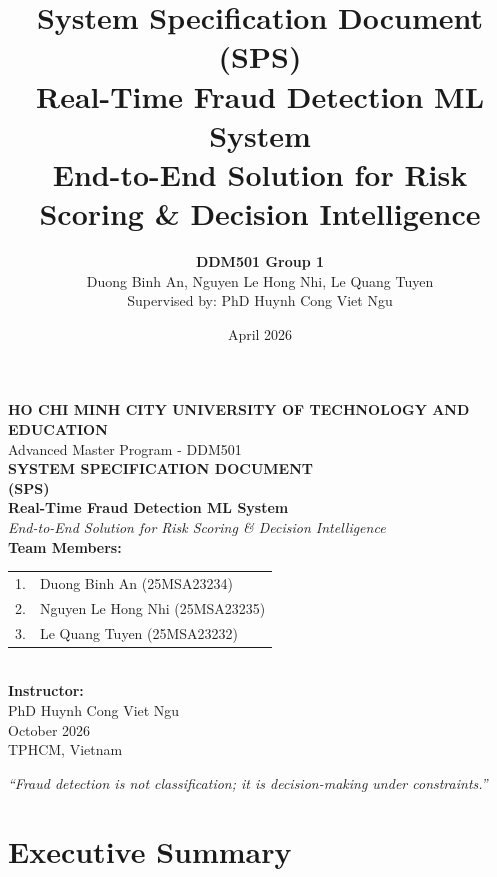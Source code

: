 \documentclass[12pt,a4paper]{article}
\title{\LARGE \textbf{System Specification Document (SPS)} \\[0.3cm]
       \Large Real-Time Fraud Detection ML System \\[0.3cm]
       \large End-to-End Solution for Risk Scoring \& Decision Intelligence}
\author{\textbf{DDM501 Group 1} \\[0.2cm]
        Duong Binh An, Nguyen Le Hong Nhi, Le Quang Tuyen \\
        Supervised by: PhD Huynh Cong Viet Ngu}
\date{April 2026}
\begin{document}
\begin{titlepage}
\centering
\vspace*{3cm}

{\Large \textbf{HO CHI MINH CITY UNIVERSITY OF TECHNOLOGY AND EDUCATION}}\\[0.5cm]
{\normalsize Advanced Master Program - DDM501}\\[2.5cm]

{\LARGE \textbf{SYSTEM SPECIFICATION DOCUMENT}}\\[0.3cm]
{\LARGE \textbf{(SPS)}}\\[2cm]

{\Large \textbf{Real-Time Fraud Detection ML System}}\\[0.2cm]
{\large \textit{End-to-End Solution for Risk Scoring \& Decision Intelligence}}\\[3cm]

\textbf{Team Members:}\\[0.3cm]
\begin{tabular}{ll}
  1. & Duong Binh An (25MSA23234) \\
  2. & Nguyen Le Hong Nhi (25MSA23235) \\
  3. & Le Quang Tuyen (25MSA23232) \\
\end{tabular}\\[1cm]

\textbf{Instructor:}\\
PhD Huynh Cong Viet Ngu\\[2cm]

{\normalsize October 2026} \\
{\normalsize TPHCM, Vietnam}

\vfill
\textit{``Fraud detection is not classification; it is decision-making under constraints.''}

\end{titlepage}

\newpage
\tableofcontents
\newpage

\section{Executive Summary}
\end{document}
